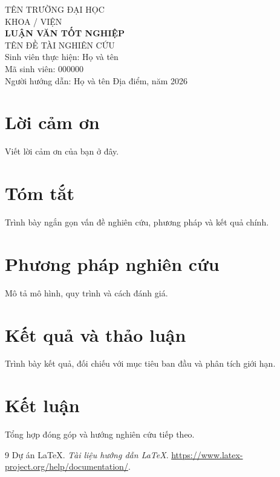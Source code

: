 \documentclass[12pt,a4paper,oneside]{report}
\begin{document}
\begin{titlepage}
\centering
{\large TÊN TRƯỜNG ĐẠI HỌC\\KHOA / VIỆN}\\[3cm]
{\LARGE\bfseries LUẬN VĂN TỐT NGHIỆP}\\[1cm]
{\Large TÊN ĐỀ TÀI NGHIÊN CỨU}\\[2cm]
Sinh viên thực hiện: Họ và tên\\[0.4cm]
Mã sinh viên: 000000\\[0.4cm]
Người hướng dẫn: Họ và tên
\vfill
Địa điểm, năm 2026
\end{titlepage}
\chapter*{Lời cảm ơn}
Viết lời cảm ơn của bạn ở đây.
\chapter*{Tóm tắt}
Trình bày ngắn gọn vấn đề nghiên cứu, phương pháp và kết quả chính.
\tableofcontents
\clearpage
{}

\chapter{Phương pháp nghiên cứu}
Mô tả mô hình, quy trình và cách đánh giá.
\chapter{Kết quả và thảo luận}
Trình bày kết quả, đối chiếu với mục tiêu ban đầu và phân tích giới hạn.
\chapter{Kết luận}
Tổng hợp đóng góp và hướng nghiên cứu tiếp theo.
\begin{thebibliography}{9}
 Dự án LaTeX.
\textit{Tài liệu hướng dẫn LaTeX}.
\url{https://www.latex-project.org/help/documentation/}.
\end{thebibliography}
\end{document}
